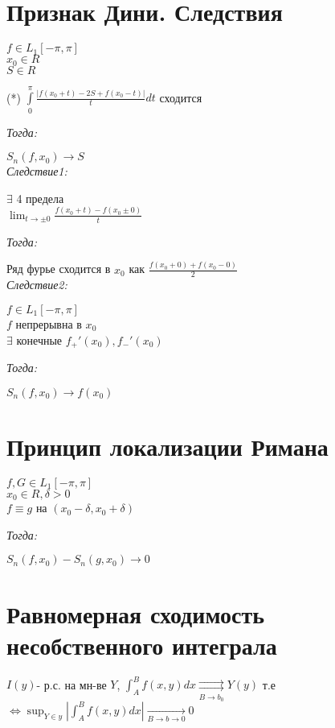 \documentclass[paper=a4, fontsize=14pt]{article}
\begin{document}
\section{Признак Дини. Следствия}

$ f \in L_1[-\pi, \pi] $\\
$ x_0 \in R $\\
$ S \in R $

(*) $ \int\limits_{0}^{\pi} \frac{|f(x_0 + t) - 2S + f(x_0 - t)|}{t} dt $ сходится

\emph{Тогда:}

$ S_n(f, x_0) \to S $\\

\emph{Следствие1:}

$ \exists $ 4 предела\\
$ \lim_{t \to \pm 0} \frac{f(x_0 + t) - f(x_0 \pm 0)}{t} $

\emph{Тогда:}

Ряд фурье сходится в $ x_0 $ как $ \frac{f(x_0 + 0) + f(x_0 - 0)}{2} $\\

\emph{Следствие2:}

$ f \in L_1[-\pi, \pi] $\\
$ f $ непрерывна в  $ x_0 $\\
$ \exists $ конечные $ f_{+}'(x_0), f_{-}'(x_0) $

\emph{Тогда:}

$ S_n(f, x_0) \to f(x_0) $

\section{Принцип локализации Римана}

$ f, G \in L_1[-\pi, \pi] $\\
$ x_0 \in R, \delta > 0 $\\
$ f \equiv g $ на $ (x_0 - \delta, x_0 + \delta) $

\emph{Тогда:}

$ S_n(f, x_0) - S_n(g, x_0) \to 0 $

\section{Равномерная сходимость несобственного интеграла}
$I(y)$- р.с. на мн-ве $Y$, $\int_A^B f(x,y) dx \underset{B \to b_0}{\rightrightarrows}  Y(y)$ т.е \newline $\Leftrightarrow \sup_{Y \in y} |\int_A^B f(x,y) dx| \underset{B \rightarrow b \to 0}{\rightarrow} 0$
\end{document}
